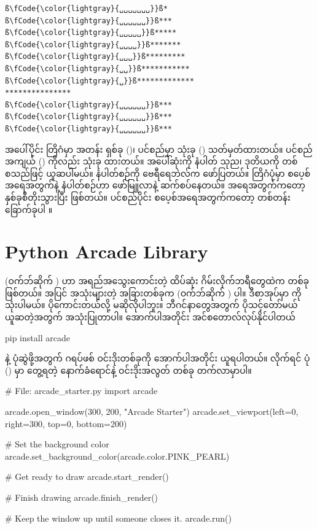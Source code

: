 %
\begin{verbatim}
ß\fCode{\color{lightgray}{␣␣␣␣␣␣␣}}ß*
ß\fCode{\color{lightgray}{␣␣␣␣␣␣}}ß***
ß\fCode{\color{lightgray}{␣␣␣␣␣}}ß*****
ß\fCode{\color{lightgray}{␣␣␣␣}}ß*******
ß\fCode{\color{lightgray}{␣␣␣}}ß*********
ß\fCode{\color{lightgray}{␣␣}}ß***********
ß\fCode{\color{lightgray}{␣}}ß*************
***************
ß\fCode{\color{lightgray}{␣␣␣␣␣␣}}ß***
ß\fCode{\color{lightgray}{␣␣␣␣␣␣}}ß***
ß\fCode{\color{lightgray}{␣␣␣␣␣␣}}ß***
\end{verbatim}
%

အပေါ်ပိုင်း တြိဂံမှာ အတန်း ရှစ်ခု ()၊ ပင်စည်မှာ သုံးခု () သတ်မှတ်ထားတယ်။ ပင်စည် အကျယ် () ကိုလည်း \fCode{*} သုံးခု ထားတယ်။ အပေါ်ဆုံးကို  နံပါတ် သုည၊ ဒုတိယကို တစ် စသည်ဖြင့် ယူဆပါမယ်။  နံပါတ်စဉ်ကို  ဗေရီရေဘဲလ်က ဖော်ပြတယ်။ တြိဂံပုံမှာ  စပေ့စ်အရေအတွက်နဲ့   နံပါတ်စဉ်ဟာ  ဖော်မြူလာနဲ့ ဆက်စပ်နေတယ်။ \fCode{*} အရေအတွက်ကတော့ နှစ်ခုစီတိုးသွားပြီး  ဖြစ်တယ်။ ပင်စည်ပိုင်း စပေ့စ်အရေအတွက်ကတော့ တစ်တန်း ခြောက်ခုပါ  ။


\section{Python Arcade Library}
 (ဝက်ဘ်ဆိုက် ) ဟာ အရည်အသွေးကောင်းတဲ့ ထိပ်ဆုံး  ဂိမ်းလိုက်ဘရီတွေထဲက တစ်ခုဖြစ်တယ်။  အပြင် အသုံးများတဲ့ အခြားတစ်ခုက  (ဝက်ဘ်ဆိုက် ) ပါ။ ဒီစာအုပ်မှာ  ကို သုံးပါမယ်။  ပိုကောင်းတယ်လို့ မဆိုလိုပါဘူး။ ဘီဂင်နာတွေအတွက် ပိုသင့်တော်မယ် ယူဆတဲ့အတွက် အသုံးပြုတာပါ။ အောက်ပါအတိုင်း အင်စတောလ်လုပ်နိုင်ပါတယ်
\begin{codetxt}
pip install arcade
\end{codetxt}

  နဲ့ ပုံဆွဲဖို့အတွက် ဂရပ်ဖစ် ဝင်းဒိုးတစ်ခုကို အောက်ပါအတိုင်း ယူရပါတယ်။  လိုက်ရင် ပုံ (\fRefNo{\ref{fig:ch07starter}}) မှာ တွေ့ရတဲ့ နောက်ခံရောင်နဲ့ ဝင်းဒိုးအလွတ် တစ်ခု တက်လာမှာပါ။
%
\begin{py}
# File: arcade_starter.py
import arcade

arcade.open_window(300, 200, "Arcade Starter")
arcade.set_viewport(left=0, right=300, top=0, bottom=200)

# Set the background color
arcade.set_background_color(arcade.color.PINK_PEARL)

# Get ready to draw
arcade.start_render()

# Finish drawing
arcade.finish_render()

# Keep the window up until someone closes it.
arcade.run()
\end{py}
%

